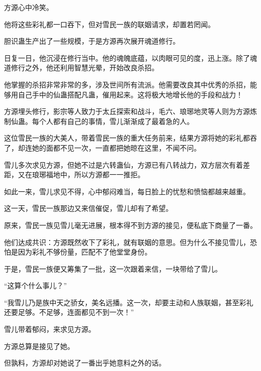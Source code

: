 \begin{this_body}
方源心中冷笑。

他将这些彩礼都一口吞下，但对雪民一族的联姻请求，却置若罔闻。

胆识蛊生产出了一些规模，于是方源再次展开魂道修行。

日复一日，他沉浸在修行当中。他的魂魄底蕴，以肉眼可见的度，迅上涨。除了魂道修行之外，他还利用智慧光晕，开始改良杀招。

他掌握的杀招非常非常的多，涉及世间所有流派。他需要改良其中优秀的杀招，能够用自己手中的仙蛊搭配凡蛊，催用起来。这将极大地增长他的手段和战力！

方源埋头修行，影宗等人致力于太丘探索和战斗，毛六、琅琊地灵等人则为方源炼制仙蛊。每个人都有自己的事情，雪儿渐渐成了最着急的人。

这位雪民一族的大美人，带着雪民一族的重大任务前来，结果方源将她的彩礼都吞了，却连她的面都不见一次，一直都把她晾在这里，不闻不问。

雪儿多次求见方源，但她不过是六转蛊仙，方源已有八转战力，双方层次有着差距，又在琅琊福地中，所以方源都一一推拒。

如此一来，雪儿求见不得，心中郁闷难当，每日脸上的忧愁和愤恼都越来越重。

这一天，雪民一族那边又来信催促，雪儿却有了希望。

原来，雪民一族见雪儿毫无进展，根本得不到方源的接见，便私底下商量了一番。

他们达成共识：方源既然收下了彩礼，就有联姻的意思。但为什么不接见雪儿，恐怕是因为彩礼不够份量，匹配不了他堂堂身份。

于是，雪民一族便又筹集了一批，这一次跟着来信，一块带给了雪儿。

“这算个什么事儿？”

“我雪儿乃是族中天之骄女，美名远播。这一次，却要主动和人族联姻，甚至彩礼还要足够。不足够，连面都见不到一次！”

雪儿带着郁闷，来求见方源。

方源总算是接见了她。

但孰料，方源却对她说了一番出乎她意料之外的话。

\end{this_body}

